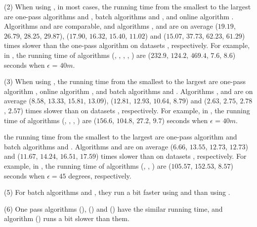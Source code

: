 \sstab (2) When using \ped, in most cases, the running time from the smallest to the largest are one-pass algorithms \siped and \operb, batch algorithms \tpa and \dpa, and online algorithm \bqsa.
Algorithms \siped and \operb are comparable, and algorithms \tpa, \dpa and \bqsa are on average
($19.19$, $26.79$, $28.25$, $29.87$), ($17.90$, $16.32$, $15.40$, $11.02$) and ($15.07$, $37.73$, $62.23$, $61.29$)
times slower than the one-pass algorithm \siped on datasets \dSets, respectively.
%
For example, in \mopsi, the running time of algorithms
(\tpa, \dpa, \bqsa, \siped, \operb ) are ($232.9$, $124.2$, $469.4$, $7.6$, $8.6$) seconds when $\epsilon$ = $40m$.

\sstab (3) When using \sed, the running time from the smallest to the largest are one-pass algorithm \cised, online algorithm \squishe, and batch algorithms \tpa and \dpa.
Algorithms \tpa, \dpa and \squishe are on average
($8.58$, $13.33$, $15.81$, $13.09$), ($12.81$, $12.93$, $10.64$, $8.79$) and
($2.63$, $2.75$, $2.78$, $2.57$) times slower than \cised on datasets \dSets, respectively.
%
For example, in \mopsi, the running time of algorithms
(\tpa, \dpa, \squishe, \cised) are  ($156.6$, $104.8$, $27.2$, $9.7$) seconds when $\epsilon$ = $40m$.

 the running time from the smallest to the
largest are one-pass algorithm \interval and batch algorithms \tpa and \dpa.
%
Algorithms \tpa and \dpa are on average
($6.66$, $13.55$, $12.73$, $12.73$) and ($11.67$, $14.24$, $16.51$, $17.59$)
times slower than \interval on datasets \dSets, respectively.
%
For example, in \mopsi, the running time of algorithms
(\tpa, \dpa, \interval) are ($105.57$, $152.53$, $8.57$) seconds when
$\epsilon=45$ degrees, respectively.

\sstab (5) For batch algorithms \dpa and \tpa, they run a bit faster using \sed and \dad than using
\ped.

\sstab (6) One pass algorithms \siped (\ped), \operb (\ped) and \interval (\dad) have the similar running time, and algorithm \cised (\sed) runs a bit slower than them.






